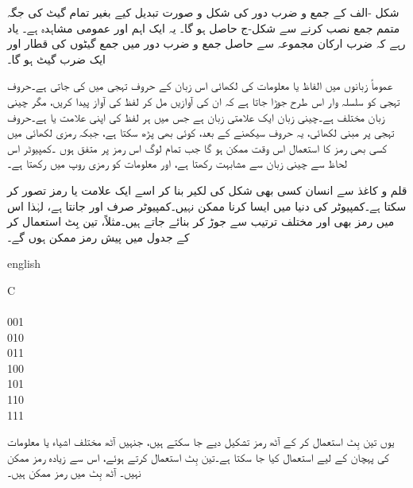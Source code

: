 شکل -الف کے جمع و ضرب دور کی شکل و صورت تبدیل کیے بغیر تمام گیٹ کی جگہ متمم جمع نصب کرنے سے شکل-ج حاصل ہو گا۔ یہ ایک اہم اور عمومی مشاہدہ ہے۔ یاد رہے کہ ضرب ارکان مجموعہ سے حاصل جمع و ضرب دور میں جمع گیٹوں کی قطار اور ایک ضرب گیٹ ہو گا۔



عموماً زبانوں میں الفاظ یا معلومات کی لکھائی اس زبان کے حروف تہجی میں کی جاتی ہے۔حروف تہجی کو سلسلہ وار اس طرح جوڑا جاتا ہے کہ ان کی آوازیں مل کر لفظ کی آواز پیدا کریں، مگر چینی زبان مختلف ہے۔چینی زبان ایک علامتی زبان ہے جس میں ہر لفظ کی اپنی علامت یا  ہے۔حروف تہجی پر مبنی لکھائی، یہ حروف سیکھنے کے بعد، کوئی بھی پڑھ سکتا ہے، جبکہ رمزی لکھائی میں کسی بھی رمز کا استعمال اس وقت ممکن ہو گا جب تمام لوگ اس رمز پر متفق ہوں ۔کمپیوٹر اس لحاظ سے چینی زبان سے مشابہت رکھتا ہے، اور معلومات کو رمزی روپ میں رکھتا ہے۔ 

قلم و کاغذ سے انسان کسی بھی شکل کی لکیر بنا کر اسے ایک علامت یا رمز تصور کر سکتا ہے۔کمپیوٹر کی دنیا میں ایسا کرنا ممکن نہیں۔کمپیوٹر صرف  اور  جانتا ہے، لہٰذا اس میں رمز بھی  اور  مختلف ترتیب سے جوڑ کر بنائے جاتے ہیں۔مثلاً، تین بِٹ استعمال کر کے جدول  میں پیش رمز ممکن ہوں گے۔
\begin{table}
\caption{تین بِٹ رمز۔}
\label{جدول_بوولین_تین_بٹ_رموز}
\centering
\begin{otherlanguage*}{english}
 \begin{LTR}
\begin{tabular}{C}
\toprule
{}\\
\\
001\\
010\\
011\\
100\\
101\\
110\\
111\\
\bottomrule
\end{tabular}
\end{LTR}
 \end{otherlanguage*}
\end{table}
یوں تین بِٹ استعمال کر کے آٹھ رمز تشکیل دیے جا سکتے ہیں، جنہیں آٹھ مختلف اشیاء یا معلومات کی پہچان کے لیے استعمال کیا جا سکتا ہے۔تین بِٹ استعمال کرتے ہوئے، اس سے زیادہ رمز ممکن نہیں۔ آٹھ بِٹ میں  رمز ممکن ہیں۔

